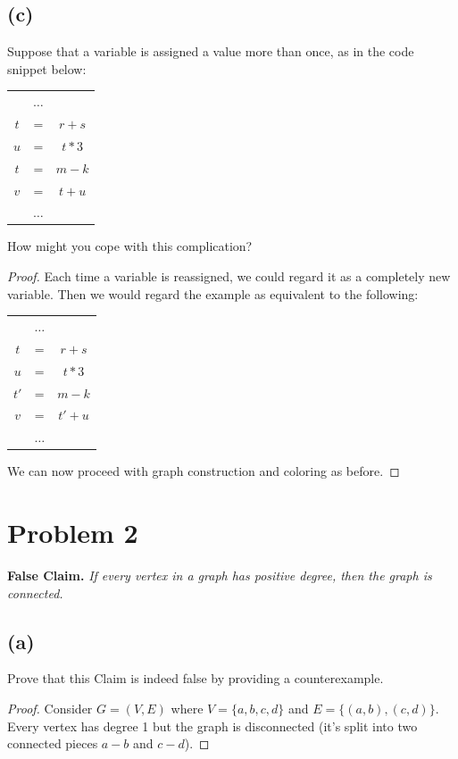 \documentclass[14pt]{extarticle}
\begin{document}
\subsection{(c)}
Suppose that a variable is assigned a value more than once, as in the code snippet below:

\begin{center}
\begin{tabular}{ccc}
& $\ldots$ & \\
$t$ & = & $r+s$ \\
$u$ & = & $t*3$ \\
$t$ & = & $m-k$\\
$v$ & = & $t+u$\\
 & $\ldots$ &
\end{tabular}
\end{center}

How might you cope with this complication?

\begin{proof}
Each time a variable is reassigned, we could regard it as a completely new variable. Then we would regard the example as equivalent to the following:

\begin{center}
\begin{tabular}{ccc}
& $\ldots$ & \\
$t$ & = & $r+s$ \\
$u$ & = & $t*3$ \\
$t'$ & = & $m-k$\\
$v$ & = & $t'+u$\\
 & $\ldots$ &
\end{tabular}
\end{center}

We can now proceed with graph construction and coloring as before.
\end{proof}

\section{Problem 2}
{\bf False Claim.} {\it If every vertex in a graph has positive degree, then the graph is connected.}

\subsection{(a)}
Prove that this Claim is indeed false by providing a counterexample.
\begin{proof}
Consider $G = (V,E)$ where $V = \{a,b,c,d\}$ and $E = \{(a, b), (c, d)\}$. Every vertex has degree 1 but the graph is disconnected (it's split into two connected pieces $a-b$ and $c-d$).
\end{proof}
\end{document}
